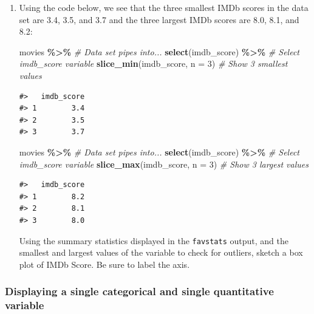 \documentclass[
]{report}
\newenvironment{Shaded}{\begin{snugshade}}{\end{snugshade}}
\newcommand{\CommentTok}[1]{\textcolor[rgb]{0.56,0.35,0.01}{\textit{#1}}}
\newcommand{\DataTypeTok}[1]{\textcolor[rgb]{0.13,0.29,0.53}{#1}}
\newcommand{\DecValTok}[1]{\textcolor[rgb]{0.00,0.00,0.81}{#1}}
\newcommand{\KeywordTok}[1]{\textcolor[rgb]{0.13,0.29,0.53}{\textbf{#1}}}
\newcommand{\NormalTok}[1]{#1}
\newcommand{\OperatorTok}[1]{\textcolor[rgb]{0.81,0.36,0.00}{\textbf{#1}}}
\newcommand{\StringTok}[1]{\textcolor[rgb]{0.31,0.60,0.02}{#1}}
\begin{document}
\begin{enumerate}
\def\labelenumi{\arabic{enumi}.}
\setcounter{enumi}{11}
\item
  Using the code below, we see that the three smallest IMDb scores in the data set are 3.4, 3.5, and 3.7 and the three largest IMDb scores are 8.0, 8.1, and 8.2:

\begin{Shaded}
\begin{Highlighting}[]
\NormalTok{movies }\OperatorTok{\%\textgreater{}\%}\StringTok{ }\CommentTok{\# Data set pipes into...}
\StringTok{  }\KeywordTok{select}\NormalTok{(imdb\_score) }\OperatorTok{\%\textgreater{}\%}\StringTok{ }\CommentTok{\# Select imdb\_score variable}
\StringTok{  }\KeywordTok{slice\_min}\NormalTok{(imdb\_score, }\DataTypeTok{n =} \DecValTok{3}\NormalTok{)  }\CommentTok{\# Show 3 smallest values}
\end{Highlighting}
\end{Shaded}

\begin{verbatim}
#>   imdb_score
#> 1        3.4
#> 2        3.5
#> 3        3.7
\end{verbatim}

\begin{Shaded}
\begin{Highlighting}[]
\NormalTok{movies }\OperatorTok{\%\textgreater{}\%}\StringTok{ }\CommentTok{\# Data set pipes into...}
\StringTok{  }\KeywordTok{select}\NormalTok{(imdb\_score) }\OperatorTok{\%\textgreater{}\%}\StringTok{ }\CommentTok{\# Select imdb\_score variable}
\StringTok{  }\KeywordTok{slice\_max}\NormalTok{(imdb\_score, }\DataTypeTok{n =} \DecValTok{3}\NormalTok{)  }\CommentTok{\# Show 3 largest values}
\end{Highlighting}
\end{Shaded}

\begin{verbatim}
#>   imdb_score
#> 1        8.2
#> 2        8.1
#> 3        8.0
\end{verbatim}

  Using the summary statistics displayed in the \texttt{favstats} output, and the smallest and largest values of the variable to check for outliers, sketch a box plot of IMDb Score. Be sure to label the axis.
\end{enumerate}

\vspace{1.5in}

\newpage

\hypertarget{displaying-a-single-categorical-and-single-quantitative-variable}{%
\subsubsection*{Displaying a single categorical and single quantitative variable}\label{displaying-a-single-categorical-and-single-quantitative-variable}}
\end{document}

